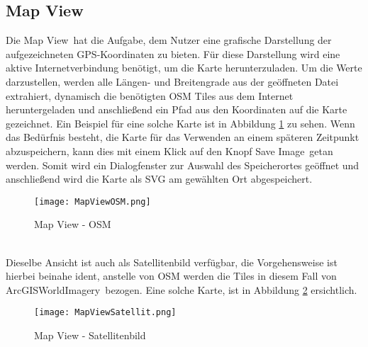 \subsection{Map View}
\label{subsec:VisMapView}
Die \glqq Map View\grqq\ hat die Aufgabe, dem Nutzer eine grafische Darstellung der aufgezeichneten \ac{GPS}-Koordinaten zu bieten. Für diese Darstellung wird eine aktive Internetverbindung benötigt, um die Karte herunterzuladen. Um die Werte darzustellen, werden alle Längen- und Breitengrade aus der geöffneten Datei extrahiert, dynamisch die benötigten \ac{OSM} Tiles aus dem Internet heruntergeladen und anschließend ein Pfad aus den Koordinaten auf die Karte gezeichnet. Ein Beispiel für eine solche Karte ist in Abbildung 
\ref{fig:OSMMapView} zu sehen. Wenn das Bedürfnis besteht, die Karte für das Verwenden an einem späteren Zeitpunkt abzuspeichern, kann dies mit einem Klick auf den Knopf \glqq Save Image\grqq\ getan werden. Somit wird ein Dialogfenster zur Auswahl des Speicherortes geöffnet und anschließend wird die Karte als \ac{SVG} am gewählten Ort abgespeichert.
\begin{figure}[h]
\centering
\texttt{[image: MapViewOSM.png]}
\caption{Map View - \ac{OSM}}
\label{fig:OSMMapView}
\end{figure}
\\
Dieselbe Ansicht ist auch als Satellitenbild verfügbar, die Vorgehensweise ist hierbei beinahe ident, anstelle von \ac{OSM} werden die Tiles in diesem Fall von \glqq ArcGISWorldImagery\grqq\ bezogen. Eine solche Karte, ist in Abbildung \ref{fig:SatteliteMapView} ersichtlich. 
\begin{figure}[h]
\centering
\texttt{[image: MapViewSatellit.png]}
\caption{Map View - Satellitenbild}
\label{fig:SatteliteMapView}
\end{figure}